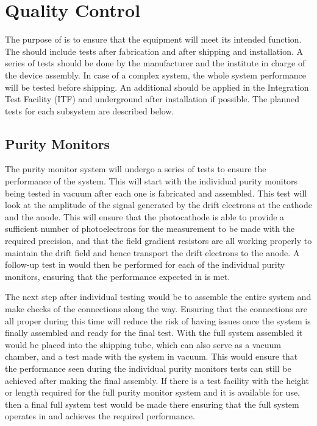 \section{Quality Control}
\label{sec:fdgen-slow-cryo-qc}
The purpose of   is to ensure that the equipment will meet its intended function. The  should include tests after fabrication and after shipping and installation. A series of tests should be done by the manufacturer and the institute in charge of the device assembly. In case of a complex system, the whole system performance will be tested before shipping. 
An additional  should be applied in the Integration Test Facility (ITF) and underground after installation if possible. The planned tests for each subsystem are described below.  


\subsection{Purity Monitors}
\label{sec:fdgen-slow-cryo-qc-pm}

The purity monitor system will undergo a series of tests to ensure the performance of the system.  This will start with the individual purity monitors being tested in vacuum after each one is fabricated and assembled.  This test will look at the amplitude of the signal generated by the drift electrons at the cathode and the anode.  This will ensure that the photocathode is able to provide a sufficient number of photoelectrons for the measurement to be made with the required precision, and that the field gradient resistors are all working properly to maintain the drift field and hence transport the drift electrons to the anode.  A follow-up test in \lar would then be performed for each of the individual purity monitors, ensuring that the performance expected in \lar is met.  

The next step after individual testing would be to assemble the entire system and make checks of the connections along the way.  Ensuring that the connections are all proper during this time will reduce the risk of having issues once the system is finally assembled and ready for the final test.  With the full system assembled it would be placed into the shipping tube, which can also serve as a vacuum chamber, and a test made with the system in vacuum.  This would ensure that the performance seen during the individual purity monitors tests can still be achieved after making the final assembly.  If there is a \lar test facility with the height or length required for the full purity monitor system and it is available for use, then a final full system test would be made there ensuring that the full system operates in \lar and achieves the required performance.

